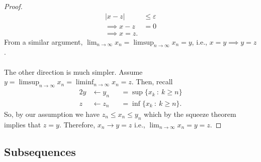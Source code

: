\documentclass{article}
\newcommand{\mylim}[2]{\lim_{#1 \to #2}}
\newcommand{\?}{\stackrel{?}{=}}
\theoremstyle{definition} %
\begin{document}
\begin{itemize}
\begin{proof}
\begin{align*}
                  |x - z|        & \leq \varepsilon \\
                  \implies x - z & = 0              \\
                  \implies x = z.
              \end{align*}
              From a similar argument, $\mylim{n}{\infty} x_n = \limsup_{n \to \infty} x_n = y$, i.e., $x = y \implies y = z$. \\\\
              The other direction is much simpler. Assume $y = \limsup_{n \to \infty} x_n = \liminf_{n \to \infty} x_n = z$. Then, recall
              \begin{alignat*}{2}
                  y & \leftarrow y_n &  & = \sup\{x_k \ : \ k \geq n\}  \\
                  z & \leftarrow z_n &  & = \inf\{x_k \ : \ k \geq n\}.
              \end{alignat*}
              So, by our assumption we have $z_n \leq x_n \leq y_n$ which by the squeeze theorem implies that $z = y$. Therefore, $x_n \rightarrow y = z$ i.e., $\lim_{n \to \infty} x_n = y = z$.
          \end{proof}
\end{itemize}

\subsection{Subsequences}
\end{document}
